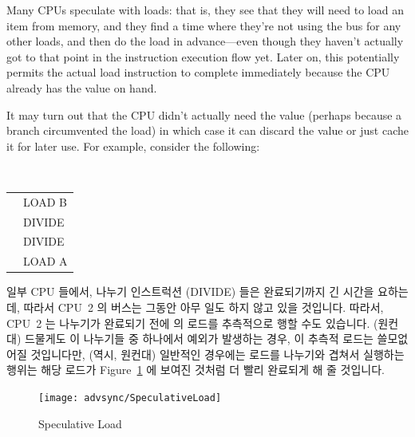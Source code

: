 \begin{enumerate}
Many CPUs speculate with loads: that is, they see that they will need to
load an item from memory, and they find a time where they're not using
the bus for any other loads, and then do the load in advance---even though
they haven't actually got to that point in the instruction execution
flow yet.
Later on, this potentially permits the actual load instruction to
complete immediately because the CPU already has the value on hand.

It may turn out that the CPU didn't actually need the value (perhaps because a
branch circumvented the load) in which case it can discard the value or just
cache it for later use.
For example, consider the following:
\fi

\vspace{5pt}
\begin{minipage}[t]{\columnwidth}
\tt
\scriptsize
\begin{tabular}{l|p{1.5in}}
	\nf{CPU 1} &	\nf{CPU 2} \\
	\hline
		&	LOAD B \\
		&	DIVIDE \\
		&	DIVIDE \\
		&	LOAD A \\
\end{tabular}
\end{minipage}
\vspace{5pt}

일부 CPU 들에서, 나누기 인스트럭션 (DIVIDE) 들은 완료되기까지 긴 시간을
요하는데, 따라서 CPU~2 의 버스는 그동안 아무 일도 하지 않고 있을 것입니다.
따라서, CPU~2 는 나누기가 완료되기 전에  의 로드를 추측적으로 행할 수도
있습니다.
(원컨대) 드물게도 이 나누기들 중 하나에서 예외가 발생하는 경우, 이 추측적
로드는 쓸모없어질 것입니다만, (역시, 원컨대) 일반적인 경우에는 로드를 나누기와
겹쳐서 실행하는 행위는 해당 로드가 Figure~\ref{fig:advsync:Speculative Load} 에
보여진 것처럼 더 빨리 완료되게 해 줄 것입니다.

\begin{figure}[htbp]
\centering
\texttt{[image: advsync/SpeculativeLoad]}
\caption{Speculative Load}
\label{fig:advsync:Speculative Load}
\end{figure}


\end{enumerate}
